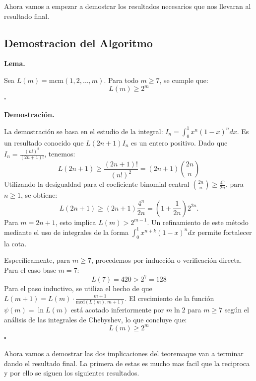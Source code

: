 \documentclass{article}
\newenvironment{dem}{\par\noindent\textbf{Demostración.}\par}{\hfill$\square$\par}
\newenvironment{lem}{\par\noindent\textbf{Lema.}\par}{\hfill$\square$\par}
\begin{document}
Ahora vamos a empezar a demostrar los resultados necesarios que nos llevaran al resultado final.\\

\subsection{Demostracion del Algoritmo}
\begin{lem}
Sea $L(m) = \text{mcm}(1, 2, \dots, m)$. Para todo $m \ge 7$, se cumple que:
\[ L(m) \ge 2^m \]
\end{lem}

\begin{dem}
La demostración se basa en el estudio de la integral:
$ I_n = \int_{0}^{1} x^n (1-x)^n dx $.
Es un resultado conocido que $L(2n+1) I_n$ es un entero positivo. Dado que $I_n = \frac{(n!)^2}{(2n+1)!}$, tenemos:
\begin{equation}
L(2n+1) \ge \frac{(2n+1)!}{(n!)^2} = (2n+1) \binom{2n}{n}
\end{equation}
Utilizando la desigualdad para el coeficiente binomial central $\binom{2n}{n} \ge \frac{4^n}{2n}$, para $n \ge 1$, se obtiene:
\[
L(2n+1) \ge (2n+1)\frac{4^n}{2n} = \left(1+\frac{1}{2n}\right)2^{2n}.
\]
Para $m = 2n+1$, esto implica $L(m) > 2^{m-1}$. Un refinamiento de este método mediante el uso de integrales de la forma $\int_{0}^{1} x^{n+k}(1-x)^n dx$ permite fortalecer la cota. 

Específicamente, para $m \ge 7$, procedemos por inducción o verificación directa. 
Para el caso base $m=7$:
\[ L(7) = 420 > 2^7 = 128 \]
Para el paso inductivo, se utiliza el hecho de que $L(m+1) = L(m) \cdot \frac{m+1}{\text{mcd}(L(m), m+1)}$. El crecimiento de la función $\psi(m) = \ln L(m)$ está acotado inferiormente por $m \ln 2$ para $m \ge 7$ según el análisis de las integrales de Chebyshev, lo que concluye que:
\[ L(m) \ge 2^m \]
\end{dem} 

Ahora vamos a demostrar las dos implicaciones del teoremaque van a terminar dando el resultado final. La primera de estas es mucho mas facil que la reciproca y por ello se siguen los siguientes resultados.\\
\end{document}
